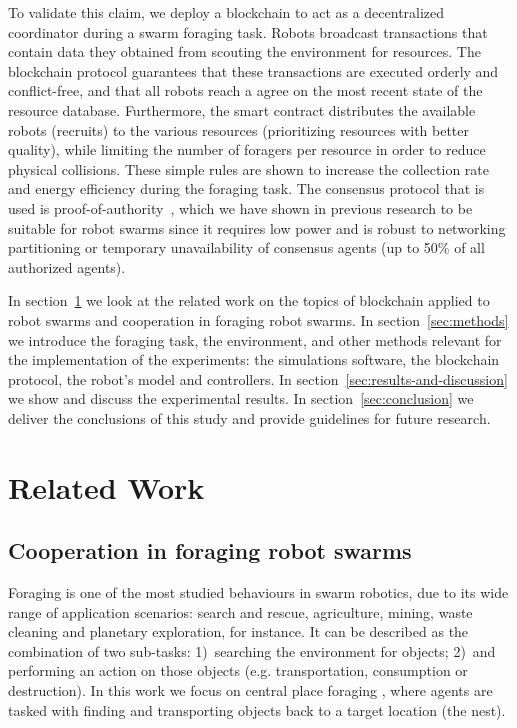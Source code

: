 \documentclass[runningheads]{llncs}
\newcommand{\poa}{proof-of-authority\xspace}
\begin{document}
To validate this claim, we deploy a blockchain to act as a decentralized coordinator during a swarm foraging task. Robots broadcast transactions that contain data they obtained from scouting the environment for resources. The blockchain protocol guarantees that these transactions are executed orderly and conflict-free, and that all robots reach a agree on the most recent state of the resource database. Furthermore, the smart contract distributes the available robots (recruits) to the various resources (prioritizing resources with better quality), while limiting the number of foragers per resource in order to reduce physical collisions. These simple rules are shown to increase the collection rate and energy efficiency during the foraging task. 
The consensus protocol that is used is \poa~\cite{poa_online}, which we have shown in previous research \cite{StrCasDor2020_frontiers,pacheco_ants_2020} to be suitable for robot swarms since it requires low power and is robust to networking partitioning or temporary unavailability of consensus agents (up to 50\% of all authorized agents).

In section~\ref{sec:related-work} we look at the related work on the topics of blockchain applied to robot swarms and cooperation in foraging robot swarms. In section~\ref{sec:methods} we introduce the foraging task, the environment, and other methods relevant for the implementation of the experiments: the simulations software, the blockchain protocol, the robot's model and controllers. In section~\ref{sec:results-and-discussion} we show and discuss the experimental results. In section~\ref{sec:conclusion} we deliver the conclusions of this study and provide guidelines for future research.


\section{Related Work}
\label{sec:related-work}

\subsection{Cooperation in foraging robot swarms}
\label{sec:rw-foraging}
Foraging is one of the most studied behaviours in swarm robotics, due to its wide range of application scenarios: search and rescue, agriculture, mining, waste cleaning and planetary exploration, for instance. It can be described as the combination of two sub-tasks: 1)~searching the environment for objects; 2)~and performing an action on those objects (e.g. transportation, consumption or destruction). 
In this work we focus on central place foraging \cite{houston_general_1985}, where agents are tasked with finding and transporting objects back to a target location (the nest). 
\end{document}
